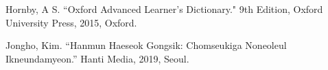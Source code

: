 \par Hornby, A S. ``Oxford Advanced Learner's Dictionary." 9th Edition, Oxford University Press, 2015, Oxford.
\par Jongho, Kim. ``Hanmun Haeseok Gongsik: Chomseukiga Noneoleul Ikneundamyeon.'' Hanti Media, 2019, Seoul.
